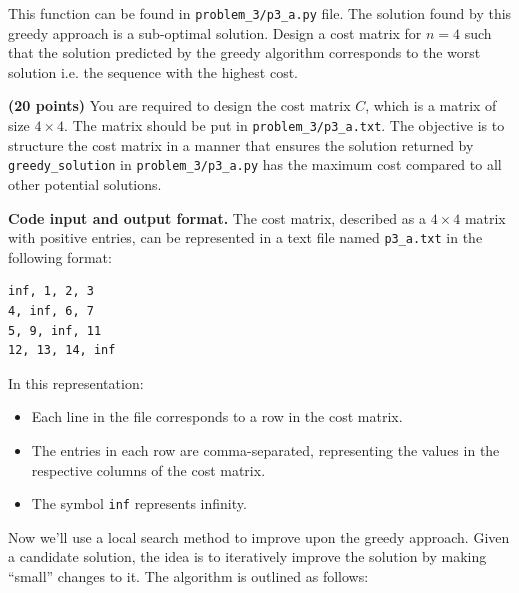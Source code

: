 \documentclass{hw}
\newcommand{\io}{\textbf{Code input and output format.} }
\begin{document}
\begin{problem}
\begin{subproblem}
This function can be found in \texttt{problem\_3/p3\_a.py} file. The solution found by this greedy approach is a sub-optimal solution. Design a cost matrix for $n=4$ such that the solution predicted by the greedy algorithm corresponds to the worst solution i.e. the sequence with the highest cost. %
\end{subproblem}

\textbf{(20 points)} You are required to design the cost matrix $C$, which is a matrix of size $4 \times 4$. The matrix should be put in \texttt{problem\_3/p3\_a.txt}. The objective is to structure the cost matrix in a manner that ensures the solution returned by \texttt{greedy\_solution} in \texttt{problem\_3/p3\_a.py} has the maximum cost compared to all other potential solutions.

\io The cost matrix, described as a $4 \times 4$ matrix with positive entries, can be represented in a text file named \texttt{p3\_a.txt} in the following format:

\begin{lstlisting}
inf, 1, 2, 3
4, inf, 6, 7
5, 9, inf, 11
12, 13, 14, inf
\end{lstlisting}

In this representation:
\begin{itemize}
    \item Each line in the file corresponds to a row in the cost matrix.
    \item The entries in each row are comma-separated, representing the values in the respective columns of the cost matrix.
    \item The symbol \texttt{inf} represents infinity.
\end{itemize}


\begin{subproblem}
Now we'll use a local search method to improve upon the greedy approach. Given a candidate solution, the idea is to iteratively improve the solution by making ``small'' changes to it. The algorithm is outlined as follows:


\end{subproblem}
\end{problem}
\end{document}
